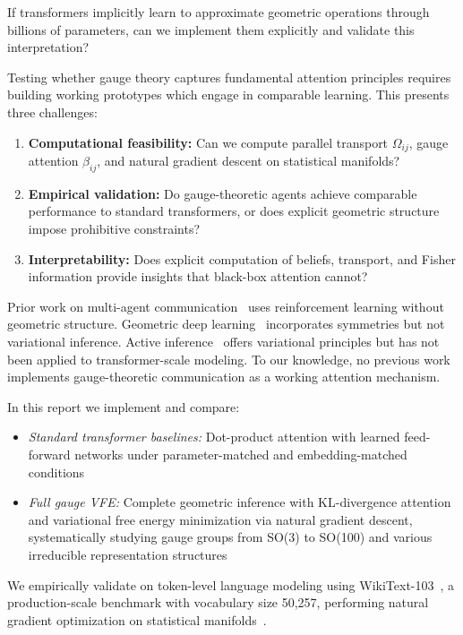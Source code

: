 \documentclass[twoside,11pt]{article}
\begin{document}
If transformers implicitly learn to approximate geometric operations through billions of parameters, can we implement them explicitly and validate this interpretation?

Testing whether gauge theory captures fundamental attention principles requires building working prototypes which engage in comparable learning. This presents three challenges:
%
\begin{enumerate}
    \item \textbf{Computational feasibility:} Can we compute parallel transport $\Omega_{ij}$, gauge attention $\beta_{ij}$, and natural gradient descent on statistical manifolds?
    
    \item \textbf{Empirical validation:} Do gauge-theoretic agents achieve comparable performance to standard transformers, or does explicit geometric structure impose prohibitive constraints?
    
    \item \textbf{Interpretability:} Does explicit computation of beliefs, transport, and Fisher information provide insights that black-box attention cannot?
\end{enumerate}

Prior work on multi-agent communication~\citep{foerster2016learning,sukhbaatar2016learning} uses reinforcement learning without geometric structure. Geometric deep learning~\citep{bronstein2021geometric,fuchs2020se3} incorporates symmetries but not variational inference. Active inference~\citep{friston2010free,parr2022active} offers variational principles but has not been applied to transformer-scale modeling. To our knowledge, no previous work implements gauge-theoretic communication as a working attention mechanism.

In this report we implement and compare:
    \begin{itemize}
        \item[(i)] \emph{Standard transformer baselines:} Dot-product attention with learned feed-forward networks under parameter-matched and embedding-matched conditions
        \item[(ii)] \emph{Full gauge VFE:} Complete geometric inference with KL-divergence attention and variational free energy minimization via natural gradient descent, systematically studying gauge groups from SO(3) to SO(100) and various irreducible representation structures
    \end{itemize}

We empirically validate on token-level language modeling using WikiText-103~\citep{merity2016pointer}, a production-scale benchmark with vocabulary size 50,257, performing natural gradient optimization on statistical manifolds~\citep{amari1998natural,martens2015optimizing}.
\end{document}

